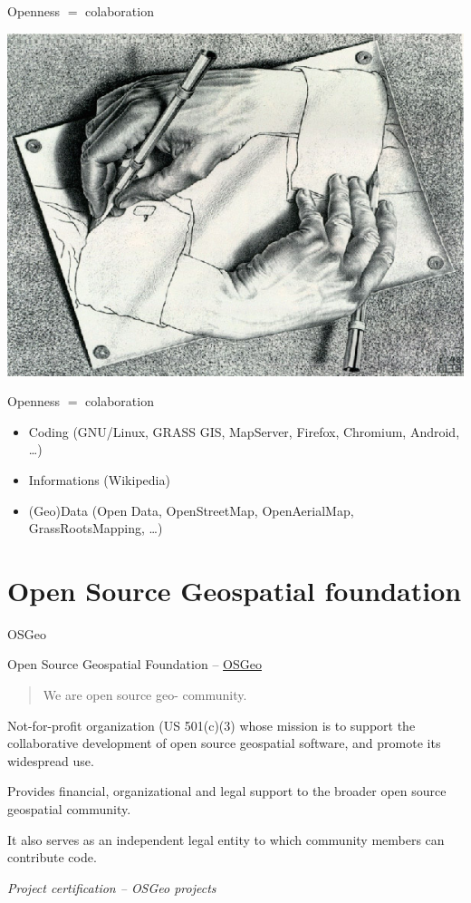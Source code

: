 \documentclass[xcolor=dvipsnames]{beamer}
\begin{document}
\begin{frame}{Openness $=$ colaboration}
        \begin{center}
            \includegraphics[width=\textheight]{imgs/ils/escher.jpg}
        \end{center}
\end{frame}

\begin{frame}{Openness $=$ colaboration}
    \begin{itemize}
        \item Coding (GNU/Linux, GRASS GIS, MapServer, Firefox, Chromium,
        Android, \dots)
            \pause
        \item Informations (Wikipedia)
            \pause
        \item (Geo)Data (Open Data, OpenStreetMap, OpenAerialMap, GrassRootsMapping,
        \dots)
    \end{itemize}
\end{frame}

\section{Open Source Geospatial foundation}

\begin{frame}{OSGeo}
\begin{block}{Open Source Geospatial Foundation -- \href{http://osgeo.org}{OSGeo}}
\begin{quote}
    We are open source geo- community.
\end{quote}
Not-for-profit organization (US 501(c)(3) whose mission is to support the collaborative development of open source geospatial software, and promote its widespread use.

Provides financial, organizational and legal support to the broader open source geospatial community. 

It also serves as an independent legal entity to which community members can
contribute code.

{\em Project certification -- OSGeo projects}
\end{block}
\end{frame}
\end{document}
